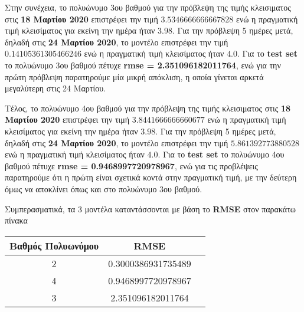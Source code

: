 \documentclass[Second Project.tex]{subfiles}
\begin{document}
Στην συνέχεια, το πολυώνυμο 3ου βαθμού για την πρόβλεψη της τιμής κλεισιματος στις \textbf{18 Μαρτίου 2020} 
επιστρέφει την τιμή $3.5346666666667828$ ενώ η πραγματική τιμή κλεισίματος για εκείνη την ημέρα ήταν
$3.98$. Για την πρόβλεψη 5 ημέρες μετά, δηλαδή στις \textbf{24 Μαρτίου 2020}, το μοντέλο επιστρέφει την τιμή 
$0.14105361305466246$ ενώ η πραγματική τιμή κλεισίματος ήταν $4.0$. Για το \textlatin{\textbf{test set}} το
πολυώνυμο 3ου βαθμού πέτυχε \textbf{\textlatin{rmse} = 2.351096182011764}, ενώ για την πρώτη πρόβλεψη παρατηρούμε
μία μικρή απόκλιση, η οποία γίνεται αρκετά μεγαλύτερη στις 24 Μαρτίου.

Τέλος, το πολυώνυμο 4ου βαθμού για την πρόβλεψη της τιμής κλεισιματος στις \textbf{18 Μαρτίου 2020} 
επιστρέφει την τιμή $3.8441666666660677$ ενώ η πραγματική τιμή κλεισίματος για εκείνη την ημέρα ήταν
$3.98$. Για την πρόβλεψη 5 ημέρες μετά, δηλαδή στις \textbf{24 Μαρτίου 2020}, το μοντέλο επιστρέφει την τιμή 
$5.861392773880528$ ενώ η πραγματική τιμή κλεισίματος ήταν $4.0$. Για το \textlatin{\textbf{test set}} το
πολυώνυμο 4ου βαθμού πέτυχε \textbf{\textlatin{rmse} = 0.9468997720978967}, ενώ για τις προβλέψεις παρατηρούμε 
ότι η πρώτη είναι σχετικά κοντά στην πραγματική τιμή, με την δεύτερη όμως να αποκλίνει όπως και στο πολυώνυμο 
3ου βαθμού.

Συμπερασματικά, τα 3 μοντέλα καταντάσσονται με βάση το \textlatin{\textbf{RMSE}} στον παρακάτω πίνακα
\begin{center}
    \begin{tabular}{ |c|c|c| } 
     \hline
     Βαθμός Πολυωνύμου & \textlatin{RMSE} \\
     \hline
     2 & 0.3000386931735489 \\
     \hline
     4 & 0.9468997720978967 \\ 
     \hline
     3 & 2.351096182011764 \\
     \hline
    \end{tabular}
\end{center}
\end{document}
